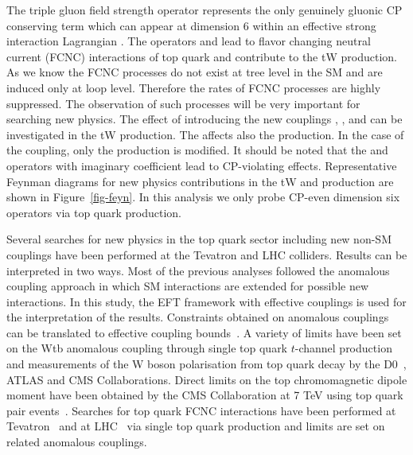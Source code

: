 The triple gluon field strength operator \OG represents the only genuinely gluonic CP conserving term which can appear at dimension 6 within an effective strong interaction Lagrangian \cite{Cho:1994yu}.
The operators \OuG and \OcG lead to flavor changing neutral current (FCNC) interactions of top quark and contribute to the tW production. As we know the FCNC processes do not exist at tree level in the SM and are induced only at loop level. Therefore the rates of FCNC processes are highly suppressed. The observation of such processes will be very important for searching new physics.
The effect of introducing the new couplings \Cphiq, \CtW, \CtG and \CucG can be investigated in the tW production. The \CtG affects also the \ttbar production. In the case of the \CG coupling, only the \ttbar production is modified.
It should be noted that the \OtW and \OtG operators with imaginary coefficient lead to CP-violating effects.
Representative Feynman diagrams for new physics contributions in the tW and \ttbar production are shown in Figure~\ref{fig-feyn}.
In this analysis we only probe CP-even dimension six operators via top quark production.

Several searches for new physics in the top quark sector including new non-SM couplings have been performed at the Tevatron and LHC colliders.
Results can be interpreted in two ways. Most of the previous analyses followed the anomalous coupling approach in which SM interactions
are extended for possible new interactions. In this study, the EFT framework with effective couplings is used for the interpretation of the results.
Constraints obtained on anomalous couplings can be translated to effective coupling bounds~\cite{Zhang:2010dr,Abazov:2012uga}.
A variety of limits have been set on the Wtb anomalous coupling through single top quark $t$-channel production
and measurements of the W boson polarisation from top quark decay by the D0~\cite{Abazov:2012uga}, ATLAS \cite{Aaboud:2017aqp,Aaboud:2016hsq} and CMS \cite{Khachatryan:2016sib,Khachatryan:2014vma} Collaborations.
Direct limits on the top chromomagnetic dipole moment have been obtained  by the CMS Collaboration at 7 TeV using top quark pair events~\cite{CMS:2014bea}.
Searches for top quark FCNC interactions have been performed at Tevatron~\cite{Abazov:2010qk,Aaltonen:2008qr} and at LHC~\cite{Khachatryan:2016sib,Aad:2015gea}
via single top quark production and limits are set on related anomalous couplings.

